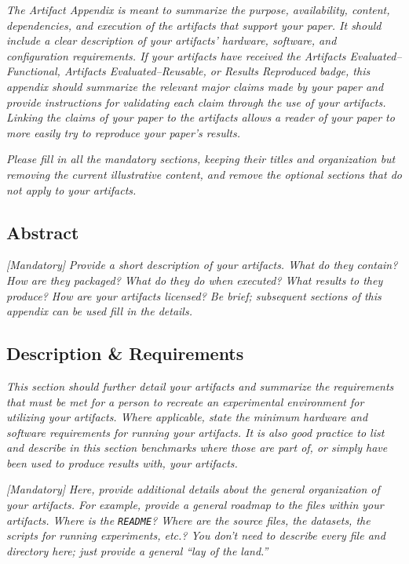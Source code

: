 \documentclass[nonacm,sigconf]{acmart}
\begin{document}
\emph{The Artifact Appendix is meant to summarize the purpose,
availability, content, dependencies, and execution of the artifacts
that support your paper.  It should include a clear description of
your artifacts' hardware, software, and configuration requirements.
If your artifacts have received the \emph{Artifacts
Evaluated--Functional}, \emph{Artifacts Evaluated--Reusable}, or
\emph{Results Reproduced} badge, this appendix should summarize the
relevant major claims made by your paper and provide instructions for
validating each claim through the use of your artifacts.  Linking the
claims of your paper to the artifacts allows a reader of your paper
to more easily try to reproduce your paper's results.}

\emph{Please fill in all the mandatory sections, keeping their titles
and organization but removing the current illustrative content, and
remove the optional sections that do not apply to your artifacts.}


\subsection{Abstract}

\emph{[Mandatory]}
%
\emph{Provide a short description of your artifacts.  What do they
contain?  How are they packaged?  What do they do when executed?  What
results to they produce?  How are your artifacts licensed?  Be brief;
subsequent sections of this appendix can be used fill in the details.}


\subsection{Description \& Requirements}

\emph{This section should further detail your artifacts and summarize
the requirements that must be met for a person to recreate an
experimental environment for utilizing your artifacts.  Where
applicable, state the minimum hardware and software requirements for
running your artifacts.  It is also good practice to list and describe
in this section benchmarks where those are part of, or simply have
been used to produce results with, your artifacts.}

\emph{[Mandatory]}
%
\emph{Here, provide additional details about the general organization
of your artifacts.  For example, provide a general roadmap to the
files within your artifacts.  Where is the \texttt{README}?  Where are
the source files, the datasets, the scripts for running experiments,
etc.?  You don't need to describe every file and directory here; just
provide a general ``lay of the land.''}
\end{document}
